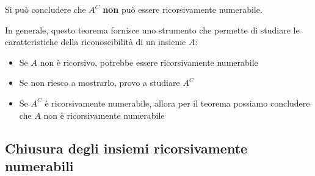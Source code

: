 Si può concludere che $A^C$ \textbf{non} può essere ricorsivamente numerabile.

In generale, questo teorema fornisce uno strumento che permette di studiare le caratteristiche della riconoscibilità di un insieme $A$:
\begin{itemize}
	\item Se $A$ non è ricorsivo, potrebbe essere ricorsivamente numerabile
	
    \item Se non riesco a mostrarlo, provo a studiare $A^C$
	
    \item Se $A^C$ è ricorsivamente numerabile, allora per il teorema possiamo concludere che $A$ non è ricorsivamente numerabile
\end{itemize}

\subsection{Chiusura degli insiemi ricorsivamente numerabili}

